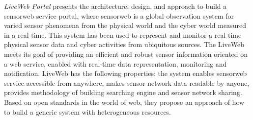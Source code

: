 	 \emph{LiveWeb Portal}\cite{yang2011liveweb} presents the architecture, design, and approach to build a sensorweb service portal, where sensorweb is a global observation system for varied sensor phenomena from the physical world and the cyber world measured in a real-time. This system has been used to represent and monitor a real-time physical sensor data and cyber activities from ubiquitous sources. The LiveWeb meets its goal of providing an efficient and robust sensor information oriented on a web service, enabled with real-time data representation, monitoring and notification. LiveWeb has the following properties: the system enables sensorweb service accessible from anywhere, makes sensor network data readable by anyone, provides methodology of building searching engine and sensor network sharing. Based on open standards in the world of web, they propose an approach of how to build a generic system with heterogeneous resources.

